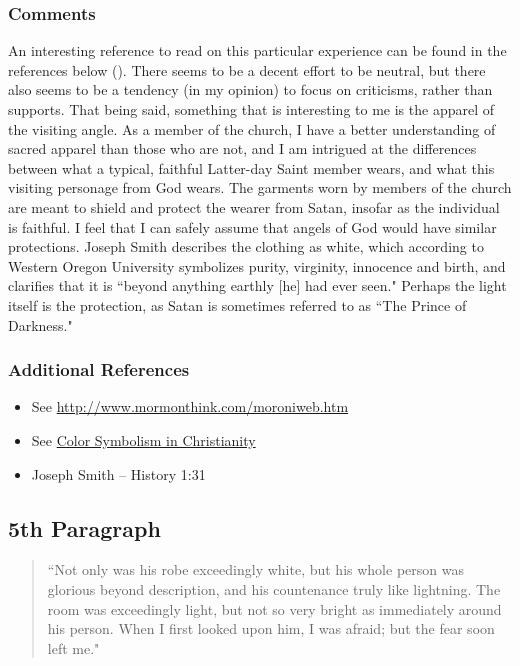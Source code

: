 \documentclass[12pt]{report}
\begin{document}
\subsubsection{Comments\label{js:comments4}}
An interesting reference to read on this particular experience can be found in the references below ().  There seems to be a decent effort to be neutral, but there also seems to be a tendency (in my opinion) to focus on criticisms, rather than supports.  That being said, something that is interesting to me is the apparel of the visiting angle.  As a member of the church, I have a better understanding of sacred apparel than those who are not, and I am intrigued at the differences between what a typical, faithful Latter-day Saint member wears, and what this visiting personage from God wears.  The garments worn by members of the church are meant to shield and protect the wearer from Satan, insofar as the individual is faithful.  I feel that I can safely assume that angels of God would have similar protections.  Joseph Smith describes the clothing as white, which according to Western Oregon University symbolizes purity, virginity, innocence and birth, and clarifies that it is ``beyond anything earthly [he] had ever seen."  Perhaps the light itself is the protection, as Satan is sometimes referred to as ``The Prince of Darkness."

\subsubsection{Additional References\label{js:references4}}
\begin{itemize}
\item See \url{http://www.mormonthink.com/moroniweb.htm}
\item See \href{https://www.wou.edu/wp/exhibits/files/2015/07/christianity.pdf}{Color Symbolism in Christianity}
\item Joseph Smith -- History 1:31
\end{itemize}

\subsection{5th Paragraph\label{js:5th}}
\begin{center}
\begin{quote}
``Not only was his robe exceedingly white, but his whole person was glorious beyond description, and his countenance truly like lightning.  The room was exceedingly light, but not so very bright as immediately around his person.  When I first looked upon him, I was afraid; but the fear soon left me."
\end{quote}
\end{center}
\end{document}
